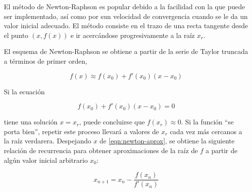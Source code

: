 El método de Newton-Raphson es popular debido a la facilidad con la que puede
ser implementado, así como por sun velocidad de convergencia cuando se le da un
valor inicial adecuado. El método consiste en el trazo de una recta tangente
desde el punto $(x, f(x))$ e ir acercándose progresivamente a la raíz $x_r$.

El esquema de Newton-Raphson se obtiene a partir de la serie de Taylor truncada
a términos de primer orden,

\[
    f(x) \approx f(x_0) + f'(x_0)(x - x_0)
\]

Si la ecuación

\begin{equation}
    f(x_0) + f'(x_0) (x - x_0) = 0 \label{eqn:newton-aprox}
\end{equation}

tiene una solución $x = x_r$, puede concluirse que $f(x_r) \approx 0$. Si la
función ``se porta bien'', repetir este proceso llevará a valores de $x_r$ cada
vez más cercanos a la raíz verdarera. Despejando $x$ de \ref{eqn:newton-aprox},
se obtiene la siguiente relación de recurrencia para obtener aproximaciones de
la raíz de $f$ a partir de algún valor inicial arbitrario $x_0$:

\begin{equation}\label{eqn:newton}
    \boxed{x_{n+1} = x_n - \frac{f(x_n)}{f'(x_n)}}
\end{equation}

